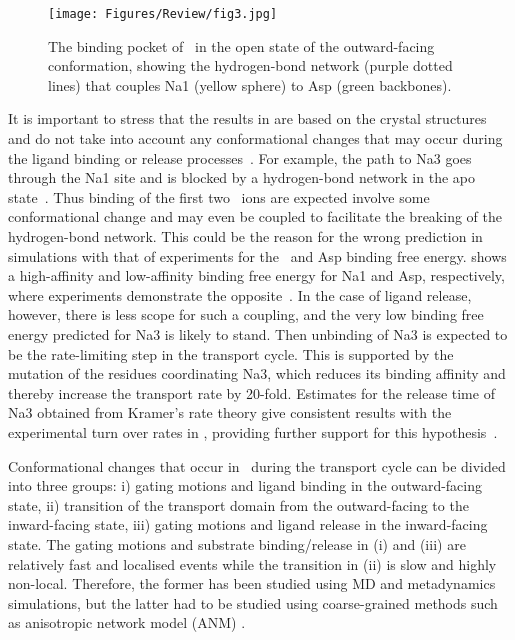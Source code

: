 \begin{figure}[t!]
\centering
\texttt{[image: Figures/Review/fig3.jpg]}
\caption{The binding pocket of \GltPh\ in the open state of the 
outward-facing conformation, showing the hydrogen-bond network (purple dotted 
lines) that couples Na1 (yellow sphere) to Asp (green backbones).}
\label{review:fig3}
\end{figure}

It is important to stress that the results in  are based on 
the crystal structures and do not take into account any conformational changes 
that may occur during the ligand binding or release processes~\cite{Hanelt2015}. 
For example, the path to Na3 goes through the Na1 site and is blocked by a 
hydrogen-bond network in the apo state~\cite{Huang2010}. Thus binding of the 
first two \Na\ ions are expected involve some conformational change and may 
even be coupled to facilitate the breaking of the hydrogen-bond network. 
This could be the reason for the wrong prediction in simulations with that of 
experiments for the \Na\ and Asp binding free energy.  shows 
a high-affinity and low-affinity binding free energy for Na1 and Asp, respectively, 
where experiments demonstrate the opposite~\cite{Hanelt2015,Ewers2013,Reyes2013b}.
In the case of ligand release, however, there is less scope for such a coupling, 
and the very low binding free energy predicted for Na3 is likely to stand. Then 
unbinding of Na3 is expected to be the rate-limiting step in the transport cycle. 
This is supported by the mutation of the residues coordinating Na3, which reduces 
its binding affinity and thereby increase the transport rate by 20-fold. Estimates 
for the release time of Na3 obtained from Kramer's rate theory give consistent 
results with the experimental turn over rates in \GltPh, providing further support 
for this hypothesis~\cite{Heinzelmann2013}.

Conformational changes that occur in \GltPh\ during the transport cycle can be 
divided into three groups: i) gating motions and ligand binding in the 
outward-facing state, ii) transition of the transport domain from the 
outward-facing to the inward-facing state, iii) gating motions and ligand 
release in the inward-facing state. The gating motions and substrate 
binding/release in (i) and (iii) are relatively fast and localised events while 
the transition in (ii) is slow and highly non-local. Therefore, the former has 
been studied using MD and metadynamics simulations, but the latter had to be 
studied using coarse-grained methods such as anisotropic network model (ANM) 
\cite{Bahar2010}. 

